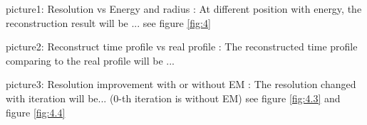 \documentclass{article}
\begin{document}
\par picture1: Resolution vs Energy and radius : At different position with energy, the reconstruction result will be ... see figure \ref{fig:4}
\par picture2: Reconstruct time profile vs real profile : The reconstructed time profile comparing to the real profile will be ...
\par picture3: Resolution improvement with or without EM : The resolution changed with iteration will be... (0-th iteration is without EM) see figure \ref{fig:4.3} and figure \ref{fig:4.4}
\begin{figure}[htbp]
\centering

%
%


%
%


\end{figure}
\end{document}
